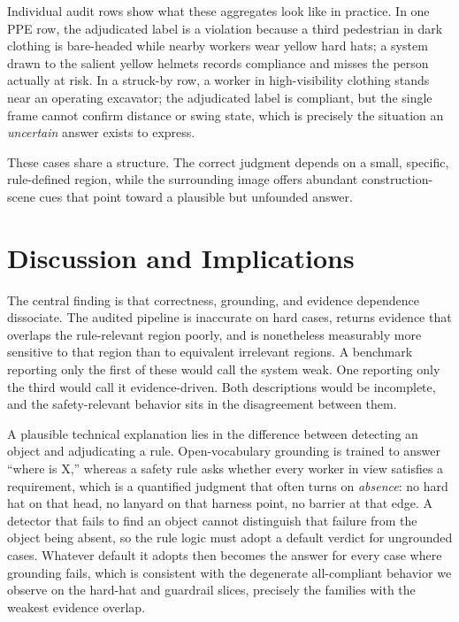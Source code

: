 \documentclass[conference]{IEEEtran}
\begin{document}
Individual audit rows show what these aggregates look like in practice. In one PPE row, the adjudicated label is a violation because a third pedestrian in dark clothing is bare-headed while nearby workers wear yellow hard hats; a system drawn to the salient yellow helmets records compliance and misses the person actually at risk. In a struck-by row, a worker in high-visibility clothing stands near an operating excavator; the adjudicated label is compliant, but the single frame cannot confirm distance or swing state, which is precisely the situation an \textit{uncertain} answer exists to express.

These cases share a structure. The correct judgment depends on a small, specific, rule-defined region, while the surrounding image offers abundant construction-scene cues that point toward a plausible but unfounded answer.

\section{Discussion and Implications}

The central finding is that correctness, grounding, and evidence dependence dissociate. The audited pipeline is inaccurate on hard cases, returns evidence that overlaps the rule-relevant region poorly, and is nonetheless measurably more sensitive to that region than to equivalent irrelevant regions. A benchmark reporting only the first of these would call the system weak. One reporting only the third would call it evidence-driven. Both descriptions would be incomplete, and the safety-relevant behavior sits in the disagreement between them.

A plausible technical explanation lies in the difference between detecting an object and adjudicating a rule. Open-vocabulary grounding is trained to answer ``where is X,'' whereas a safety rule asks whether every worker in view satisfies a requirement, which is a quantified judgment that often turns on \textit{absence}: no hard hat on that head, no lanyard on that harness point, no barrier at that edge. A detector that fails to find an object cannot distinguish that failure from the object being absent, so the rule logic must adopt a default verdict for ungrounded cases. Whatever default it adopts then becomes the answer for every case where grounding fails, which is consistent with the degenerate all-compliant behavior we observe on the hard-hat and guardrail slices, precisely the families with the weakest evidence overlap.
\end{document}
